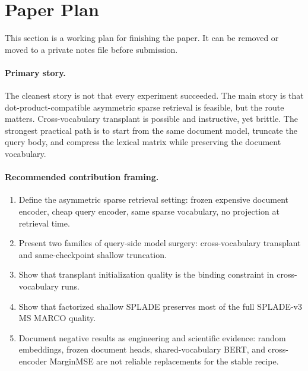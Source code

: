 \documentclass[
]{ceurart}
\begin{document}
\maketitle

\section{Paper Plan}

This section is a working plan for finishing the paper. It can be removed or
moved to a private notes file before submission.

\paragraph{Primary story.}
The cleanest story is not that every experiment succeeded. The main story is
that dot-product-compatible asymmetric sparse retrieval is feasible, but the
route matters. Cross-vocabulary transplant is possible and instructive, yet
brittle. The strongest practical path is to start from the same document model,
truncate the query body, and compress the lexical matrix while preserving the
document vocabulary.

\paragraph{Recommended contribution framing.}
\begin{enumerate}
  \item Define the asymmetric sparse retrieval setting: frozen expensive
  document encoder, cheap query encoder, same sparse vocabulary, no projection
  at retrieval time.
  \item Present two families of query-side model surgery:
  cross-vocabulary transplant and same-checkpoint shallow truncation.
  \item Show that transplant initialization quality is the binding constraint
  in cross-vocabulary runs.
  \item Show that factorized shallow SPLADE preserves most of the full
  SPLADE-v3 MS MARCO quality.
  \item Document negative results as engineering and scientific evidence:
  random embeddings, frozen document heads, shared-vocabulary BERT, and
  cross-encoder MarginMSE are not reliable replacements for the stable recipe.
\end{enumerate}
\end{document}
